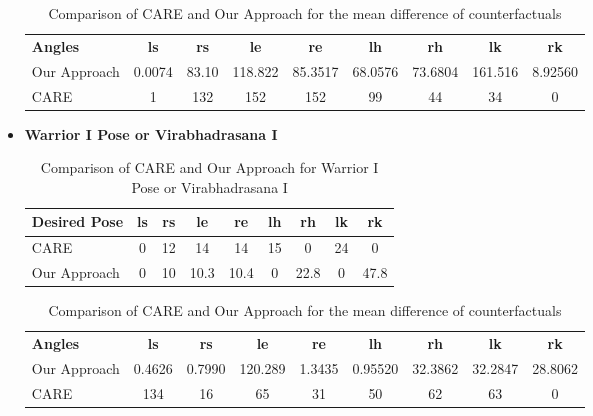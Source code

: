 \begin{itemize}
\begin{table}[h!]
\centering
\begin{tabular}{|>{\centering\arraybackslash}m{2cm}|c|c|c|c|c|c|c|c|}
\hline
\rowcolor[HTML]{D3D3D3} %
\multicolumn{9}{|c|}{\textbf{Mean of difference of Counterfactuals}} \\ \hline
\rowcolor[HTML]{D3D3D3} %
\textbf{Angles} & \textbf{ls} & \textbf{rs} & \textbf{le} & \textbf{re} & \textbf{lh} & \textbf{rh} & \textbf{lk} & \textbf{rk} \\ \hline
Our Approach & 0.0074 & 83.10 & 118.822 & 85.3517 & 68.0576 & 73.6804 & 161.516 & 8.92560 \\ \hline
CARE & 1 & 132 & 152 & 152 & 99 & 44 & 34 & 0 \\ \hline
\end{tabular}
\caption{Comparison of CARE and Our Approach for the mean difference of counterfactuals}
\end{table}

\item \textbf{Warrior I Pose or Virabhadrasana I} \newline 
\begin{table}[h!]
\centering
\begin{tabular}{|>{\centering\arraybackslash}m{4cm}|c|c|c|c|c|c|c|c|}
\hline
\rowcolor[HTML]{FFB6C1} %
\textbf{Desired Pose} & \textbf{ls} & \textbf{rs} & \textbf{le} & \textbf{re} & \textbf{lh} & \textbf{rh} & \textbf{lk} & \textbf{rk} \\ \hline
CARE & 0 & 12 & 14 & 14 & 15 & 0 & 24 & 0 \\ \hline
Our Approach & 0 & 10 & 10.3 & 10.4 & 0 & 22.8 & 0 & 47.8 \\ \hline
\end{tabular}
\caption{Comparison of CARE and Our Approach for Warrior I Pose or Virabhadrasana I}
\end{table}

\begin{table}[h!]
\centering
\begin{tabular}{|>{\centering\arraybackslash}m{3cm}|c|c|c|c|c|c|c|c|}
\hline
\rowcolor[HTML]{FFC0CB} %
\multicolumn{9}{|c|}{\textbf{Mean of difference of Counterfactuals}} \\ \hline
\rowcolor[HTML]{FFC0CB} %
\textbf{Angles} & \textbf{ls} & \textbf{rs} & \textbf{le} & \textbf{re} & \textbf{lh} & \textbf{rh} & \textbf{lk} & \textbf{rk} \\ \hline
Our Approach & 0.4626 & 0.7990 & 120.289 & 1.3435 & 0.95520 & 32.3862 & 32.2847 & 28.8062 \\ \hline
CARE & 134 & 16 & 65 & 31 & 50 & 62 & 63 & 0 \\ \hline
\end{tabular}
\caption{Comparison of CARE and Our Approach for the mean difference of counterfactuals}
\end{table}

\end{itemize}
